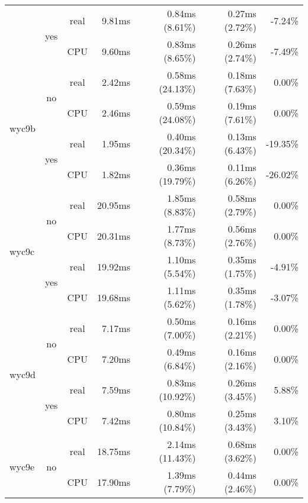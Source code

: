 \documentclass[en]{pracamgr}
\begin{document}
\begin{appendices}
\begin{small}
\begin{longtable}{|l|c|c|r|r|r|r|}
                          \cline{2-7}
                          & \multirow{2}{*}{yes} & real & 9.81ms & 0.84ms (8.61\%) & 0.27ms (2.72\%) & -7.24\% \\*
                          &                      & CPU  & 9.60ms & 0.83ms (8.65\%) & 0.26ms (2.74\%) & -7.49\% \\
\hline
\multirow{4}{*}{wyc9b}    & \multirow{2}{*}{no}  & real & 2.42ms & 0.58ms (24.13\%) & 0.18ms (7.63\%) & 0.00\% \\*
                          &                      & CPU  & 2.46ms & 0.59ms (24.08\%) & 0.19ms (7.61\%) & 0.00\% \\*
                          \cline{2-7}
                          & \multirow{2}{*}{yes} & real & 1.95ms & 0.40ms (20.34\%) & 0.13ms (6.43\%) & -19.35\% \\*
                          &                      & CPU  & 1.82ms & 0.36ms (19.79\%) & 0.11ms (6.26\%) & -26.02\% \\
\hline
\multirow{4}{*}{wyc9c}    & \multirow{2}{*}{no}  & real & 20.95ms & 1.85ms (8.83\%) & 0.58ms (2.79\%) & 0.00\% \\*
                          &                      & CPU  & 20.31ms & 1.77ms (8.73\%) & 0.56ms (2.76\%) & 0.00\% \\*
                          \cline{2-7}
                          & \multirow{2}{*}{yes} & real & 19.92ms & 1.10ms (5.54\%) & 0.35ms (1.75\%) & -4.91\% \\*
                          &                      & CPU  & 19.68ms & 1.11ms (5.62\%) & 0.35ms (1.78\%) & -3.07\% \\
\hline
\multirow{4}{*}{wyc9d}    & \multirow{2}{*}{no}  & real & 7.17ms & 0.50ms (7.00\%) & 0.16ms (2.21\%) & 0.00\% \\*
                          &                      & CPU  & 7.20ms & 0.49ms (6.84\%) & 0.16ms (2.16\%) & 0.00\% \\*
                          \cline{2-7}
                          & \multirow{2}{*}{yes} & real & 7.59ms & 0.83ms (10.92\%) & 0.26ms (3.45\%) & 5.88\% \\*
                          &                      & CPU  & 7.42ms & 0.80ms (10.84\%) & 0.25ms (3.43\%) & 3.10\% \\
\hline
\multirow{4}{*}{wyc9e}    & \multirow{2}{*}{no}  & real & 18.75ms & 2.14ms (11.43\%) & 0.68ms (3.62\%) & 0.00\% \\*
                          &                      & CPU  & 17.90ms & 1.39ms (7.79\%) & 0.44ms (2.46\%) & 0.00\% \\*

\end{longtable}
\end{small}
\end{appendices}
\end{document}
